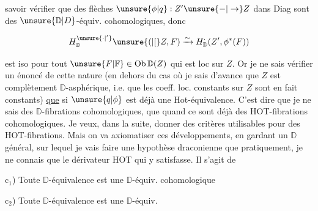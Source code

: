 savoir vérifier que des flèches $\unsure{\phi|q}:Z'\unsure{\mathord{-}|\to}Z$ dans Diag sont des $\unsure{\mathbb D|D}$-équiv. cohomologiques, donc  

\[H^{\unsure{\cdot|'}}_{\mathbb D}\unsure{(|[}Z,F)\xrightarrow{\sim}H^{\cdot}_{\mathbb D}(Z',\phi^*(F))\]

est iso pour tout $\unsure{F|\mathbb F}\in\operatorname{Ob}\mathbb D(Z)$ qui est loc  sur $Z$. Or je ne sais vérifier un énoncé de cette nature (en dehors du cas où je sais d'avance que $Z$ est complètement $\mathbb D$-asphérique, i.e. que les coeff. loc. constants sur $Z$ sont en fait constants) \uline{que} si $\unsure{q|\phi}$ est déjà une Hot-équivalence. C'est dire que je ne sais   des $\mathbb D$-fibrations cohomologiques, que quand ce sont déjà des HOT-fibrations cohomologiques. Je veux, dans la suite, donner des critères utilisables pour des HOT-fibrations. Mais on va axiomatiser  ces développements, en gardant un $\mathbb D$ général, sur lequel je vais faire une hypothèse  draconienne que pratiquement, je ne connais que le dérivateur HOT qui y satisfasse. Il s'agit de  

 c$_1$) Toute $\mathbb D$-équivalence est une $\mathbb D$-équiv. cohomologique

c$_2$) Toute $\mathbb D$-équivalence est une $\mathbb D$-équiv. 
